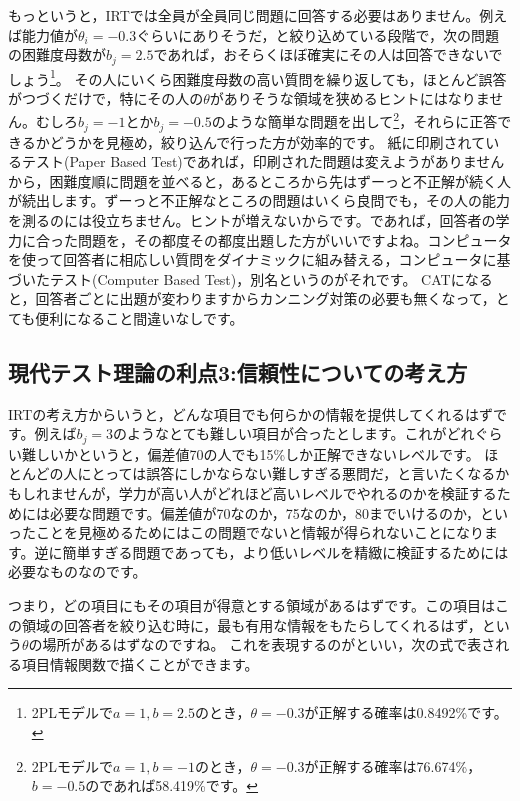 \documentclass{ltjsbook}
\begin{document}
もっというと，IRTでは全員が全員同じ問題に回答する必要はありません。例えば能力値が$\theta_i = -0.3$ぐらいにありそうだ，と絞り込めている段階で，次の問題の困難度母数が$b_j = 2.5$であれば，おそらくほぼ確実にその人は回答できないでしょう\footnote{2PLモデルで$a=1,b=2.5$のとき，$\theta=-0.3$が正解する確率は0.8492\%です。}。
その人にいくら困難度母数の高い質問を繰り返しても，ほとんど誤答がつづくだけで，特にその人の$\theta$がありそうな領域を狭めるヒントにはなりません。むしろ$b_j=-1$とか$b_j=-0.5$のような簡単な問題を出して\footnote{2PLモデルで$a=1,b=-1$のとき，$\theta=-0.3$が正解する確率は76.674\%，$b=-0.5$のであれば58.419\%です。}，それらに正答できるかどうかを見極め，絞り込んで行った方が効率的です。
紙に印刷されているテスト(Paper Based Test)であれば，印刷された問題は変えようがありませんから，困難度順に問題を並べると，あるところから先はずーっと不正解が続く人が続出します。ずーっと不正解なところの問題はいくら良問でも，その人の能力を測るのには役立ちません。ヒントが増えないからです。であれば，回答者の学力に合った問題を，その都度その都度出題した方がいいですよね。コンピュータを使って回答者に相応しい質問をダイナミックに組み替える，コンピュータに基づいたテスト(Computer Based Test)，別名というのがそれです。
CATになると，回答者ごとに出題が変わりますからカンニング対策の必要も無くなって，とても便利になること間違いなしです。

\subsection{現代テスト理論の利点3:信頼性についての考え方}
IRTの考え方からいうと，どんな項目でも何らかの情報を提供してくれるはずです。例えば$b_j=3$のようなとても難しい項目が合ったとします。これがどれぐらい難しいかというと，偏差値70の人でも15\%しか正解できないレベルです。
ほとんどの人にとっては誤答にしかならない難しすぎる悪問だ，と言いたくなるかもしれませんが，学力が高い人がどれほど高いレベルでやれるのかを検証するためには必要な問題です。偏差値が70なのか，75なのか，80までいけるのか，といったことを見極めるためにはこの問題でないと情報が得られないことになります。逆に簡単すぎる問題であっても，より低いレベルを精緻に検証するためには必要なものなのです。

つまり，どの項目にもその項目が得意とする領域があるはずです。この項目はこの領域の回答者を絞り込む時に，最も有用な情報をもたらしてくれるはず，という$\theta$の場所があるはずなのですね。
これを表現するのがといい，次の式で表される項目情報関数で描くことができます。
\end{document}
